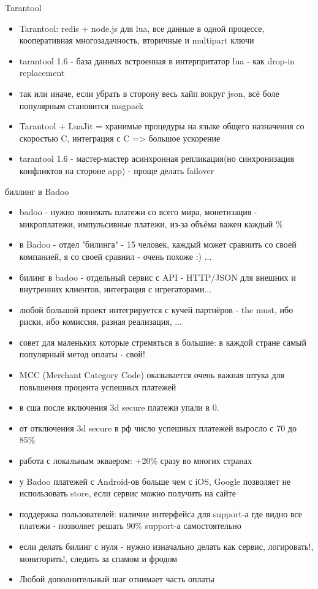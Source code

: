 \documentclass[aspectratio=169]{beamer}
\begin{document}
\begin{frame}{Tarantool}
\begin{itemize}
  \item Tarantool: redis + node.js для lua, все данные в одной процессе, кооперативная многозадачность, вторичные и multipart ключи
  \item tarantool 1.6 - база данных встроенная в интерпритатор lua - как drop-in replacement
  \item так или иначе, если убрать в сторону весь хайп вокруг json, всё боле популярным становится msgpack
  \item Tarantool + LuaJit = хранимые процедуры на языке общего назначения со скоростью C, интеграция с C => большое ускорение
  \item tarantool 1.6 - мастер-мастер асинхронная репликация(но синхронизация конфликтов на стороне app) - проще делать failover
\end{itemize}
\end{frame}
  
\begin{frame}{биллинг в Badoo}
\begin{itemize}
  \item badoo - нужно понимать платежи со всего мира, монетизация - микроплатежи, импульсивные платежи, из-за объёма важен каждый \%
  \item в Badoo - отдел "билинга" - 15 человек, каждый может сравнить со своей компанией, я со своей сравнил - очень похоже :) ...
  \item билинг в badoo - отдельный сервис с API - HTTP/JSON для внешних и внутренних клиентов,  интеграция с игрегаторами...
  \item любой большой проект интегрируется с кучей партнёров - the must, ибо риски, ибо комиссия, разная реализация, ...
  \item совет для маленьких которые стремяться в большие: в каждой стране самый популярный метод оплаты - свой!
  \item MCC (Merchant Category Code) оказывается очень важная штука для повышения процента успешных платежей
  \item в сша после включения 3d secure платежи упали в 0. 
  \item от отключения 3d secure в рф число успешных платежей выросло с 70 до 85\% 
  \item работа с локальным экваером: +20\% сразу во многих странах
  \item у Badoo платежей с Android-ов больше чем с iOS, Google позволяет не использовать store, если сервис можно получить на сайте
  \item поддержка пользователей: наличие интерфейса для support-а где видно все платежи - позволяет решать 90\% support-а самостоятельно
  \item если делать билинг с нуля - нужно изначально делать как сервис, логировать!, мониторить!, следить за спамом и фродом
  \item Любой дополнительный шаг отнимает часть оплаты
\end{itemize}
\end{frame}
\end{document}
